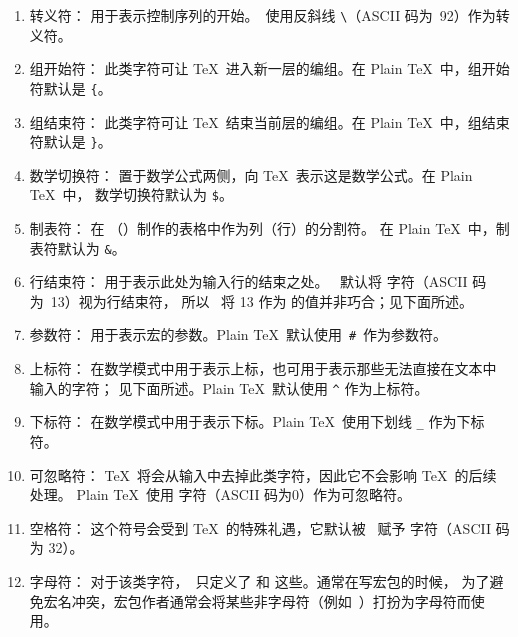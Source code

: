 \documentclass{book}
\begin{document}
\begin{enumerate} %
\setcounter{enumi}{-1}
\item\label{ini:esc}转义符：
用于表示控制序列的开始。\IniTeX\ 使用反斜线 \verb-\-（ASCII 码为~92）作为转义符。

\item{}组开始符：
此类字符可让 \TeX\ 进入新一层的编组。在 Plain \TeX\ 中，组开始符默认是 \verb-{-。

\item{}组结束符：
此类字符可让 \TeX\ 结束当前层的编组。在 Plain \TeX\ 中，组结束符默认是 \verb-}-。

\item{}数学切换符：
置于数学公式两侧，向 \TeX\ 表示这是数学公式。在 Plain \TeX\ 中，
数学切换符默认为 \verb-$-。

\item{}制表符：
在 （）制作的表格中作为列（行）的分割符。
在 Plain \TeX\ 中，制表符默认为 \verb-&-。

\item{}\label{ini:eol}行结束符：
用于表示此处为输入行的结束之处。
\IniTeX\ 默认将  字符（ASCII 码为~13）视为行结束符，
所以 \IniTeX\ 将 13 作为  的值并非巧合；见下面所述。

\item{}参数符：
用于表示宏的参数。Plain \TeX\ 默认使用~\verb-#-~作为参数符。

\item{}上标符：
在数学模式中用于表示上标，也可用于表示那些无法直接在文本中输入的字符；
见下面所述。Plain \TeX\ 默认使用 \verb-^- 作为上标符。

\item{}下标符：
在数学模式中用于表示下标。Plain \TeX\ 使用下划线 \verb-_- 作为下标符。

\item{}可忽略符：
\TeX\ 将会从输入中去掉此类字符，因此它不会影响 \TeX\ 的后续处理。
Plain \TeX\ 使用  字符（ASCII 码为0）作为可忽略符。

\item{}\label{ini:sp}空格符：
这个符号会受到 \TeX\ 的特殊礼遇，它默认被 \IniTeX\ 赋予  字符（ASCII 码为 32）。

\item{}\label{ini:let}字母符：
对于该类字符，\IniTeX\ 只定义了  和  这些。通常在写宏包的时候，
为了避免宏名冲突，宏包作者通常会将某些非字母符（例如~\n@）打扮为字母符而使用。


\end{enumerate}
\end{document}

